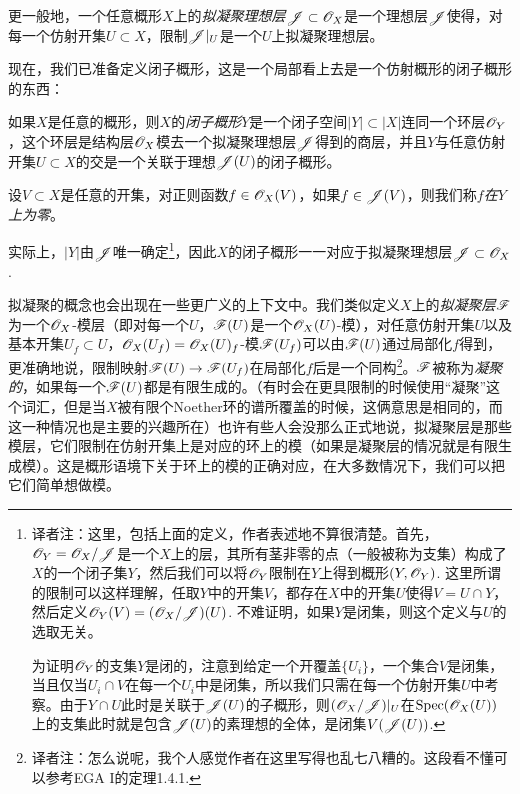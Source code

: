 更一般地，一个任意概形$X$上的\textit{拟凝聚理想层}$\mathscr{J} \subset \mathscr{O}_X$是一个理想层$\mathscr{J}$使得，对每一个仿射开集$U\subset X$，限制$\mathscr{J}|_U$是一个$U$上拟凝聚理想层。

现在，我们已准备定义闭子概形，这是一个局部看上去是一个仿射概形的闭子概形的东西：

\begin{defi}\label{defi:1.27}
	如果$X$是任意的概形，则$X$的\textit{闭子概形}$Y$是一个闭子空间$|Y|\subset |X|$连同一个环层$\mathscr{O}_Y$，这个环层是结构层$\mathscr{O}_X$模去一个拟凝聚理想层$\mathscr{J}$得到的商层，并且$Y$与任意仿射开集$U\subset X$的交是一个关联于理想$\mathscr{J}(U)$的闭子概形。

	设$V\subset X$是任意的开集，对正则函数$f\in \mathscr{O}_X(V)$，如果$f\in \mathscr{J}(V)$，则我们称$f$\textit{在}$Y$\textit{上为零}。
\end{defi}

实际上，$|Y|$由$\mathscr{J}$唯一确定\footnote{译者注：这里，包括上面的定义，作者表述地不算很清楚。首先，$\mathscr{O}_Y=\mathscr{O}_X/\mathscr{J}$是一个$X$上的层，其所有茎非零的点（一般被称为支集）构成了$X$的一个闭子集$Y$，然后我们可以将$\mathscr{O}_Y$限制在$Y$上得到概形$(Y,\mathscr{O}_Y)$. 这里所谓的限制可以这样理解，任取$Y$中的开集$V$，都存在$X$中的开集$U$使得$V=U\cap Y$，然后定义$\mathscr{O}_Y(V)=(\mathscr{O}_X/\mathscr{J})(U)$. 不难证明，如果$Y$是闭集，则这个定义与$U$的选取无关。

为证明$\mathscr{O}_Y$的支集$Y$是闭的，注意到给定一个开覆盖$\{U_i\}$，一个集合$V$是闭集，当且仅当$U_i\cap V$在每一个$U_i$中是闭集，所以我们只需在每一个仿射开集$U$中考察。由于$Y\cap U$此时是关联于$\mathscr{J}(U)$的子概形，则$(\mathscr{O}_X/\mathscr{J})|_U$在$\operatorname{Spec}(\mathscr{O}_X(U))$上的支集此时就是包含$\mathscr{J}(U)$的素理想的全体，是闭集$V(\mathscr{J}(U))$.}，因此$X$的闭子概形一一对应于拟凝聚理想层$\mathscr{J}\subset \mathscr{O}_X$.

拟凝聚的概念也会出现在一些更广义的上下文中。我们类似定义$X$上的\textit{拟凝聚层}$\mathscr{F}$为一个$\mathscr{O}_X$-模层（即对每一个$U$，$\mathscr{F}(U)$是一个$\mathscr{O}_X(U)$-模），对任意仿射开集$U$以及基本开集$U_f\subset U$，$\mathscr{O}_X(U_f)=\mathscr{O}_X(U)_f$-模$\mathscr{F}(U_f)$可以由$\mathscr{F}(U)$通过局部化$f$得到，更准确地说，限制映射$\mathscr{F}(U)\to \mathscr{F}(U_f)$在局部化$f$后是一个同构\footnote{译者注：怎么说呢，我个人感觉作者在这里写得也乱七八糟的。这段看不懂可以参考EGA I的定理1.4.1. }。$\mathscr{F}$被称为\textit{凝聚的}，如果每一个$\mathscr{F}(U)$都是有限生成的。（有时会在更具限制的时候使用“凝聚”这个词汇，但是当$X$被有限个Noether环的谱所覆盖的时候，这俩意思是相同的，而这一种情况也是主要的兴趣所在）也许有些人会没那么正式地说，拟凝聚层是那些模层，它们限制在仿射开集上是对应的环上的模（如果是凝聚层的情况就是有限生成模）。这是概形语境下关于环上的模的正确对应，在大多数情况下，我们可以把它们简单想做模。

